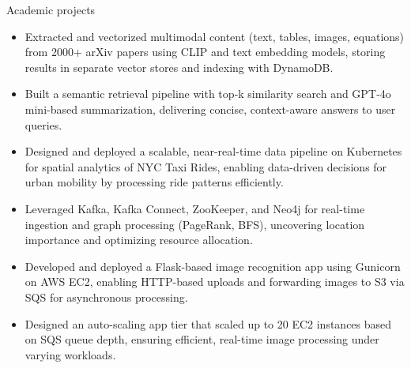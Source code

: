 \documentclass{resume}
\begin{document}
\begin{experienceSection}{Academic projects}

    \projectItem[
        title=RAG Implementation for arXiv Papers,
        duration={Oct 2024 - Nov 2024},
    ]
    \begin{itemize}
        \vspace{-0.5em}
        \itemsep -6pt {}
        \item Extracted and vectorized multimodal content (text, tables, images, equations) from 2000+ arXiv papers using CLIP and text embedding models, storing results in separate vector stores and indexing with DynamoDB.
        \item Built a semantic retrieval pipeline with top‑k similarity search and GPT‑4o mini-based summarization, delivering concise, context-aware answers to user queries.
    \end{itemize}
    
    \projectItem[
        title=Kubernetes based Data Processing Pipeline,
        duration={Oct 2024 - Nov 2024},
    ]
    \begin{itemize}
        \vspace{-0.5em}
        \itemsep -6pt {}
        \item Designed and deployed a scalable, near-real-time data pipeline on Kubernetes for spatial analytics of NYC Taxi Rides, enabling data-driven decisions for urban mobility by processing ride patterns efficiently.
        \item Leveraged Kafka, Kafka Connect, ZooKeeper, and Neo4j for real-time ingestion and graph processing (PageRank, BFS), uncovering location importance and optimizing resource allocation.
    \end{itemize}

    \projectItem[
        title=AWS-Based Face Recognition App,
        duration={Feb 2024 - May 2024},
    ]
    \begin{itemize}
        \vspace{-0.5em}
        \itemsep -6pt {}
        \item Developed and deployed a Flask-based image recognition app using Gunicorn on AWS EC2, enabling HTTP-based uploads and forwarding images to S3 via SQS for asynchronous processing.
        \item Designed an auto-scaling app tier that scaled up to 20 EC2 instances based on SQS queue depth, ensuring efficient, real-time image processing under varying workloads.
    \end{itemize}


\end{experienceSection}
\end{document}
